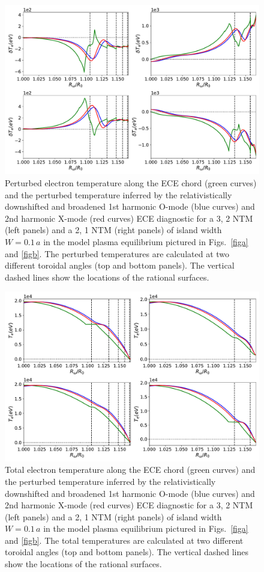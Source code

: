 \documentclass[12pt,prb,aps]{revtex4-1}
\begin{document}
\begin{figure}
\centerline{\includegraphics[width=\textwidth]{Fig16.pdf}}
\caption{Perturbed electron temperature along the ECE chord (green curves) and the perturbed temperature inferred by the relativistically downshifted and  broadened 1st harmonic
O-mode (blue curves) and 2nd harmonic X-mode (red curves) ECE diagnostic for a
3, 2 NTM (left panels) and a 2, 1 NTM (right panels) of island width $W=0.1\,a$ in the model plasma equilibrium pictured in Figs.~\ref{figa} and \ref{figb}.
The perturbed temperatures are calculated  at two different toroidal angles (top and bottom panels). 
The vertical dashed lines show the locations of the rational surfaces. 
\label{fig16}}
\end{figure}

\begin{figure}
\centerline{\includegraphics[width=\textwidth]{Fig17.pdf}}
\caption{Total electron temperature along the ECE chord (green curves) and the perturbed temperature inferred by the relativistically downshifted and broadened 
 1st harmonic
O-mode (blue curves) and 2nd harmonic X-mode (red curves) ECE diagnostic  for a
3, 2 NTM (left panels) and a 2, 1 NTM (right panels) of island width $W=0.1\,a$  in the model plasma equilibrium pictured in Figs.~\ref{figa} and \ref{figb}.
The total temperatures are calculated  at two different toroidal angles (top and bottom panels).  The vertical dashed lines show the locations of the rational surfaces. \label{fig17}}
\end{figure}
\end{document}
